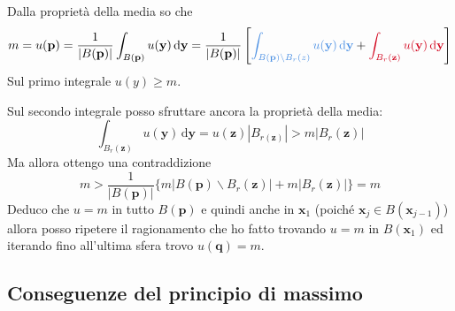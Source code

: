 \documentclass[10pt,a4paper,twoside,openright]{book}
\newcommand{\x}{\mathbf{x}}
\newcommand{\y}{\mathbf{y}}
\newcommand{\de}{\,\mathrm d}
\newcommand{\dyy}{\de \y}
\begin{document}
\begin{dimostrazione}
	Dalla proprietà della media so che 
	\begin{equation*}
	m=u(\mathbf{p}) =\frac{1}{| B(\mathbf{p})| }\int _{B(\mathbf{p})} u(\y) \dyy=\frac{1}{| B(\mathbf{p})| }\left[\textcolor[rgb]{0.29,0.56,0.89}{\int _{B(\mathbf{p}) \backslash B_{r}(z)} u(\y) \dyy} +\textcolor[rgb]{0.82,0.01,0.11}{\int _{B_{r}(\mathbf{z})} u(\y) \dyy}\right]
	\end{equation*}
	Sul primo integrale $u(y) \geqslant m$.

	Sul secondo integrale posso sfruttare ancora la proprietà della media:
	\begin{equation*}
		\int _{B_{r}(\mathbf{z})} u(\y) \dyy=u(\mathbf{z})| B_{r(\mathbf{z})}|  >m| B_{r}(\mathbf{z})| 
	\end{equation*}
	Ma allora ottengo una contraddizione
	\begin{equation*}
		m >\frac{1}{| B(\mathbf{p})| }\{m| B(\mathbf{p}) \backslash B_{r}(\mathbf{z})| +m| B_{r}(\mathbf{z})| \} =m
	\end{equation*}
	Deduco che $u=m$ in tutto $B(\mathbf{p})$ e quindi anche in $\x_{1}$ (poiché $\x_{j} \in B(\x_{j-1})$) allora posso ripetere il ragionamento che ho fatto trovando $u=m$ in $B(\x_{1})$ ed iterando fino all'ultima sfera trovo $u(\mathbf{q}) =m$.
\end{dimostrazione}
\subsection{Conseguenze del principio di massimo}
\end{document}
